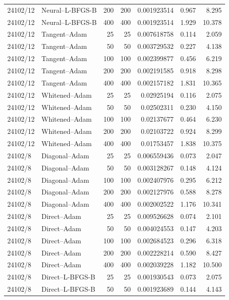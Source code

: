 \begin{longtable}{llrrrrr}
24102/12 & Neural--L-BFGS-B & 200 & 200 & 0.001923514 & 0.967 & 8.295\\
24102/12 & Neural--L-BFGS-B & 400 & 400 & 0.001923514 & 1.929 & 10.378\\
24102/12 & Tangent--Adam & 25 & 25 & 0.007618758 & 0.114 & 2.059\\
24102/12 & Tangent--Adam & 50 & 50 & 0.003729532 & 0.227 & 4.138\\
24102/12 & Tangent--Adam & 100 & 100 & 0.002399877 & 0.456 & 6.219\\
24102/12 & Tangent--Adam & 200 & 200 & 0.002191585 & 0.918 & 8.298\\
24102/12 & Tangent--Adam & 400 & 400 & 0.002157182 & 1.831 & 10.365\\
24102/12 & Whitened--Adam & 25 & 25 & 0.02925194 & 0.116 & 2.075\\
24102/12 & Whitened--Adam & 50 & 50 & 0.02502311 & 0.230 & 4.150\\
24102/12 & Whitened--Adam & 100 & 100 & 0.02137677 & 0.464 & 6.230\\
24102/12 & Whitened--Adam & 200 & 200 & 0.02103722 & 0.924 & 8.299\\
24102/12 & Whitened--Adam & 400 & 400 & 0.01753457 & 1.838 & 10.375\\
24102/8 & Diagonal--Adam & 25 & 25 & 0.006559436 & 0.073 & 2.047\\
24102/8 & Diagonal--Adam & 50 & 50 & 0.003128267 & 0.148 & 4.124\\
24102/8 & Diagonal--Adam & 100 & 100 & 0.002407976 & 0.295 & 6.212\\
24102/8 & Diagonal--Adam & 200 & 200 & 0.002127976 & 0.588 & 8.278\\
24102/8 & Diagonal--Adam & 400 & 400 & 0.002002522 & 1.176 & 10.341\\
24102/8 & Direct--Adam & 25 & 25 & 0.009526628 & 0.074 & 2.101\\
24102/8 & Direct--Adam & 50 & 50 & 0.004024553 & 0.147 & 4.203\\
24102/8 & Direct--Adam & 100 & 100 & 0.002684523 & 0.296 & 6.318\\
24102/8 & Direct--Adam & 200 & 200 & 0.002228214 & 0.590 & 8.427\\
24102/8 & Direct--Adam & 400 & 400 & 0.002039228 & 1.182 & 10.500\\
24102/8 & Direct--L-BFGS-B & 25 & 25 & 0.001930543 & 0.073 & 2.075\\
24102/8 & Direct--L-BFGS-B & 50 & 50 & 0.001923689 & 0.144 & 4.143\\

\end{longtable}
